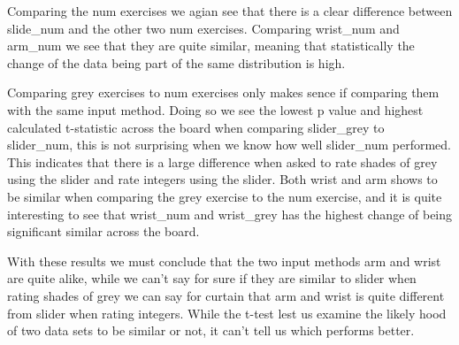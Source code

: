 Comparing the num exercises we agian see that there is a clear difference between slide\_num and the other two num exercises. Comparing wrist\_num and arm\_num we see that they are quite similar, meaning that statistically the change of the data being part of the same distribution is high.

Comparing grey exercises to num exercises only makes sence if comparing them with the same input method. Doing so we see the lowest p value and highest calculated t-statistic across the board when comparing slider\_grey to slider\_num, this is not surprising when we know how well slider\_num performed. This indicates that there is a large difference when asked to rate shades of grey using the slider and rate integers using the slider. Both wrist and arm shows to be similar when comparing the grey exercise to the num exercise, and it is quite interesting to see that wrist\_num and wrist\_grey has the highest change of being significant similar across the board. 


With these results we must conclude that the two input methods arm and wrist are quite alike, while we can't say for sure if they are similar to slider when rating shades of grey we can say for curtain that arm and wrist is quite different from slider when rating integers. While the t-test lest us examine the likely hood of two data sets to be similar or not, it can't tell us which performs better.



